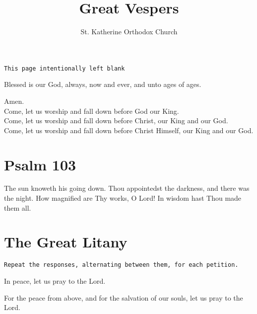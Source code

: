 \documentclass[twoside, letterpaper, 12pt]{report}
\newcommand{\instruction}[1]{%
  \texttt{\scriptsize{#1}}%
}
\newcommand{\centeredsection}[1]{%
  \needspace{10\baselineskip}%
  \section*{\centering{}#1}%
}
\begin{document}

\title{Great Vespers}
\author{St. Katherine Orthodox Church}
\date{}%
\maketitle

\instruction{This page intentionally left blank}
\cleardoublepage
\begin{priest}
\item Blessed is our God, always, now and ever, and unto ages of ages.
\end{priest}

\begin{reader}
\item Amen.\\
    Come, let us worship and fall down before God our King.\\
    Come, let us worship and fall down before Christ, our King and our God.\\
    Come, let us worship and fall down before Christ Himself, our King and our God.\\
\end{reader}

\centeredsection{Psalm 103}
\begin{multicols}{2}


The sun knoweth his going down.
Thou appointedst the darkness, and there was the night.
How magnified are Thy works, O Lord! In wisdom hast Thou made them all.
\end{multicols}


\centeredsection{The Great Litany}
\instruction{Repeat the responses, alternating between them, for each petition.}
\begin{deacon}
\item In peace, let us pray to the Lord.
\end{deacon}

\begin{deacon}
\item For the peace from above, and for the salvation of our souls,
    let us pray to the Lord.
\end{deacon}
\end{document}
